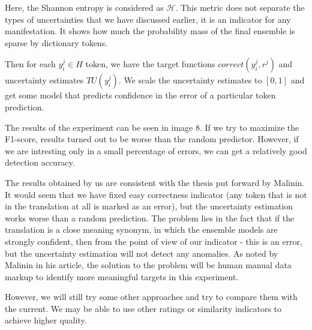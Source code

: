 \documentclass[a4paper,14pt]{extarticle}
\begin{document}
	Here, the Shannon entropy is considered as $\mathcal{H}$. This metric does not separate the types of uncertainties that we have discussed earlier, it is an indicator for any manifestation. It shows how much the probability mass of the final ensemble is sparse by dictionary tokens.

	Then for each $y_i^j \in H$ token, we have the target functions $correct(y_i^j, r^j)$ and uncertainty estimates $TU (y_i^j)$. We scale the uncertainty estimates to $[0, 1]$ and get some model that predicts confidence in the error of a particular token prediction.
	
	\begin{figure}[t]
	\end{figure}
	The results of the experiment can be seen in image 8. If we try to maximize the F1-score, results turned out to be worse than the random predictor. However, if we are intresting only in a small percentage of errors, we can get a relatively good detection accuracy.

	The results obtained by us are consistent with the thesis put forward by Malinin. It would seem that we have fixed easy correctness indicator (any token that is not in the translation at all is marked as an error), but the uncertainty estimation works worse than a random prediction. The problem lies in the fact that if the translation is a close meaning synonym, in which the ensemble models are strongly confident, then from the point of view of our indicator - this is an error, but the uncertainty estimation will not detect any anomalies. As noted by Malinin in his article, the solution to the problem will be human manual data markup to identify more meaningful targets in this experiment.

	However, we will still try some other approaches and try to compare them with the current. We may be able to use other ratings or similarity indicators to achieve higher quality.
	
\end{document}
